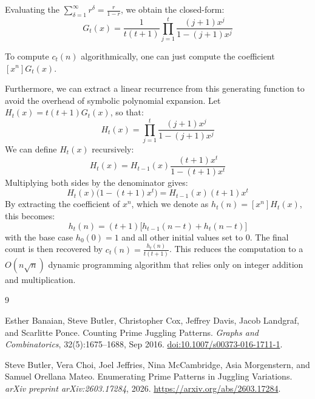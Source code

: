 \documentclass[12pt]{article}
\begin{document}
Evaluating the $\sum_{\delta=1}^\infty r^\delta = \frac{r}{1-r}$, we obtain the closed-form:
\[
    G_t(x) = \frac{1}{t(t+1)} \prod_{j=1}^t \frac{(j+1)x^j}{1 - (j+1)x^j}
\]

To compute $c_t(n)$ algorithmically, one can just compute the coefficient $[x^n] G_t(x)$. 

Furthermore, we can extract a linear recurrence from this generating function to avoid the overhead of symbolic polynomial expansion. Let $H_t(x) = t(t+1) G_t(x)$, so that:
\[
    H_t(x) = \prod_{j=1}^t \frac{(j+1)x^j}{1 - (j+1)x^j}
\]
We can define $H_t(x)$ recursively:
\[
    H_t(x) = H_{t-1}(x) \frac{(t+1)x^t}{1 - (t+1)x^t}
\]
Multiplying both sides by the denominator gives:
\[
    H_t(x) \big(1 - (t+1)x^t\big) = H_{t-1}(x) (t+1)x^t
\]
By extracting the coefficient of $x^n$, which we denote as $h_t(n) = [x^n]H_t(x)$, this becomes:
\[
    h_t(n) = (t+1) \Big[ h_{t-1}(n-t) + h_t(n-t) \Big]
\]
with the base case $h_0(0) = 1$ and all other initial values set to $0$. The final count is then recovered by $c_t(n) = \frac{h_t(n)}{t(t+1)}$. This reduces the computation to a $O(n \sqrt{n})$ dynamic programming algorithm that relies only on integer addition and multiplication.

\vspace{2em}

\begin{thebibliography}{9}

Esther Banaian, Steve Butler, Christopher Cox, Jeffrey Davis, Jacob Landgraf, and Scarlitte Ponce.
\newblock Counting Prime Juggling Patterns.
\newblock \emph{Graphs and Combinatorics}, 32(5):1675--1688, Sep 2016.
\newblock \href{https://doi.org/10.1007/s00373-016-1711-1}{doi:10.1007/s00373-016-1711-1}.

Steve Butler, Vera Choi, Joel Jeffries, Nina McCambridge, Asia Morgenstern, and Samuel Orellana Mateo.
\newblock Enumerating Prime Patterns in Juggling Variations.
\newblock \emph{arXiv preprint arXiv:2603.17284}, 2026.
\newblock \url{https://arxiv.org/abs/2603.17284}.

\end{thebibliography}
\end{document}
